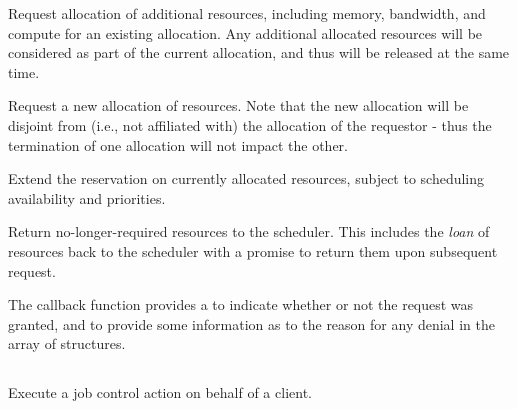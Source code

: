 \begin{compactitem}
%
\item Request allocation of additional resources, including memory, bandwidth, and compute for an existing allocation. Any additional allocated resources will be considered as part of the current allocation, and thus will be released at the same time.
%
\item Request a new allocation of resources. Note that the new allocation will be disjoint from (i.e., not affiliated with) the allocation of the requestor - thus the termination of one allocation will not impact the other.
%
\item Extend the reservation on currently allocated resources, subject to scheduling availability and priorities.
%
\item Return no-longer-required resources to the scheduler.
This includes the \textit{loan} of resources back to the scheduler with a promise to return them upon subsequent request.
\end{compactitem}

The callback function provides a  to indicate whether or not the request was granted, and to provide some information as to the reason for any denial in the  array of  structures.


\subsection{}

\summary

Execute a job control action on behalf of a client.

\format


